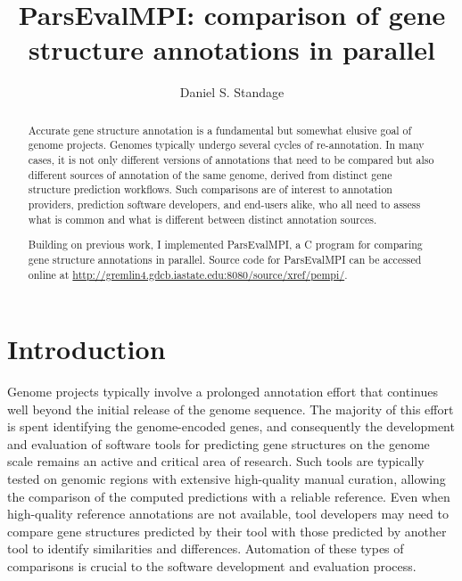 \documentclass{bioinfo}
\begin{document}

\title[ParsEvalMPI]{ParsEvalMPI: comparison of gene structure annotations in parallel}
\author[Daniel S. Standage]{Daniel S. Standage}
\address{Department of Genetics, Development, and Cell Biology}


\maketitle

\begin{abstract}
\noindent Accurate gene structure annotation is a fundamental but somewhat elusive goal of genome projects. Genomes typically undergo several cycles of re-annotation. In many cases, it is not only different versions of annotations that need to be compared but also different sources of annotation of the same genome, derived from distinct gene structure prediction workflows. Such comparisons are of interest to annotation providers, prediction software developers, and end-users alike, who all need to assess what is common and what is different between distinct annotation sources.

Building on previous work, I implemented ParsEvalMPI, a C program for comparing gene structure annotations in parallel. Source code for ParsEvalMPI can be accessed online at \url{http://gremlin4.gdcb.iastate.edu:8080/source/xref/pempi/}.
\end{abstract}

\section*{Introduction}
Genome projects typically involve a prolonged annotation effort that continues well beyond the initial release of the genome sequence. The majority of this effort is spent identifying the genome-encoded genes, and consequently the development and evaluation of software tools for predicting gene structures on the genome scale remains an active and critical area of research. Such tools are typically tested on genomic regions with extensive high-quality manual curation, allowing the comparison of the computed predictions with a reliable reference. Even when high-quality reference annotations are not available, tool developers may need to compare gene structures predicted by their tool with those predicted by another tool to identify similarities and differences. Automation of these types of comparisons is crucial to the software development and evaluation process. 
\end{document}
